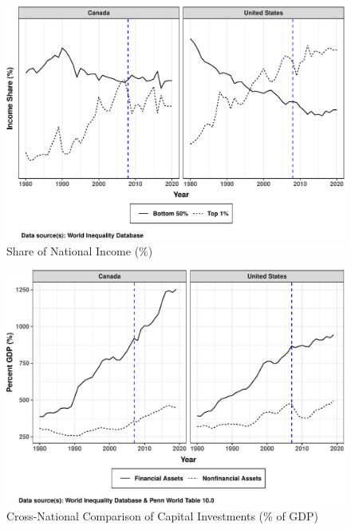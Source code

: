 \documentclass[
  11pt,
]{article}
\begin{document}
\begin{figure}[ht]

{\centering \includegraphics{fed-paper-drafting_files/figure-latex/income_dist1-1} 

}

\caption{\label{income_dist1}Share of National Income (\%)}\label{fig:income_dist1}
\end{figure}

\begin{figure}[ht]

{\centering \includegraphics{fed-paper-drafting_files/figure-latex/capital_comp-1} 

}

\caption{\label{income_dist1}Cross-National Comparison of Capital Investments (\% of GDP)}\label{fig:capital_comp}
\end{figure}
\end{document}
